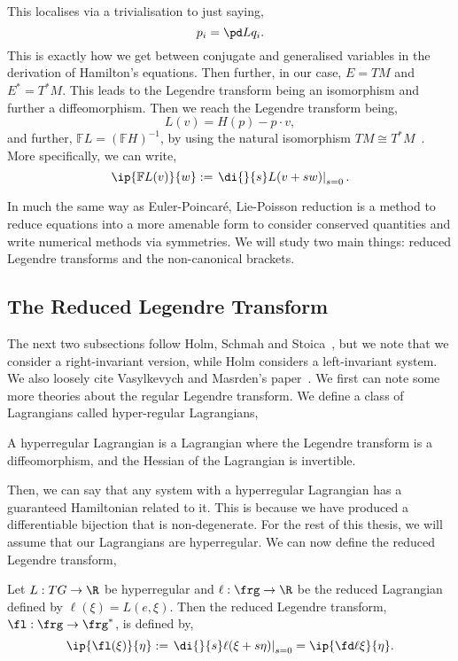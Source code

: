 {{      \noindent
      This localises via a trivialisation to just saying,
      $$ p_i = \pd L {q_i}. $$
      This is exactly how we get between conjugate and generalised variables in the derivation of Hamilton's equations. Then further, in our case, $E = TM$ and $E^* = T^*M$. This leads to the Legendre transform being an isomorphism and further a diffeomorphism. Then we reach the Legendre transform being,
      $$ L(v) = H(p) - p \cdot v, $$
      and further, $\mathbb{F}L = (\mathbb{F}H)^{-1}$, by using the natural isomorphism $TM \cong T^*M$~\cite{holm}. More specifically, we can write,
      $$ \ip{\mathbb{F}L(v)}{w} := \left.\di{}{s} L(v + sw) \right|_{s=0}. $$
    }%
}

\newpage\noindent
In much the same way as Euler-Poincar\'e, Lie-Poisson reduction is a method to reduce equations into a more amenable form to consider conserved quantities and write numerical methods via symmetries. We will study two main things: reduced Legendre transforms and the non-canonical brackets.

\subsection{The Reduced Legendre Transform}
The next two subsections follow Holm, Schmah and Stoica~\cite{holm}, but we note that we consider a right-invariant version, while Holm considers a left-invariant system. We also loosely cite Vasylkevych and Masrden's paper~\cite{vasylkevych2007liepoisson}. We first can note some more theories about the regular Legendre transform. We define a class of Lagrangians called hyper-regular Lagrangians,
\begin{ndefi}[Hyperregular]
  A hyperregular Lagrangian is a Lagrangian where the Legendre transform is a diffeomorphism, and the Hessian of the Lagrangian is invertible.
\end{ndefi}

\noindent
Then, we can say that any system with a hyperregular Lagrangian has a guaranteed Hamiltonian related to it. This is because we have produced a differentiable bijection that is non-degenerate. For the rest of this thesis, we will assume that our Lagrangians are hyperregular. We can now define the reduced Legendre transform,
\begin{ndefi}
  Let $L : TG \to \R$ be hyperregular and $\ell : \frg \to \R$ be the reduced Lagrangian defined by $\ell(\xi) = L(e, \xi)$. Then the reduced Legendre transform, $\fl : \frg \to \frg^*$, is defined by,
  \begin{equation}
    \ip{\fl (\xi)}{\eta} := \left.\di{}{s} \ell(\xi + s \eta)\right|_{s = 0} = \ip{\fd \ell \xi}{\eta}.\label{eq:rlt}
  \end{equation}
\end{ndefi}

